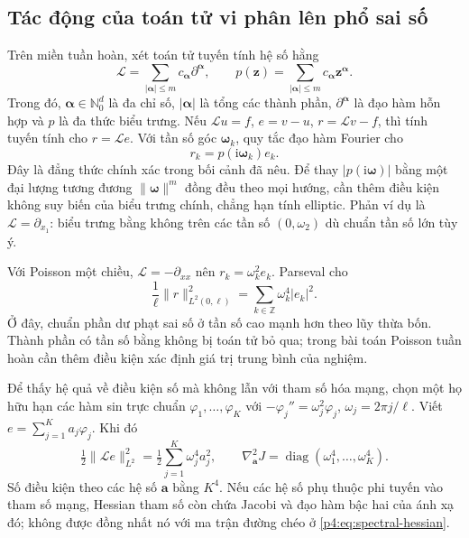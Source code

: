 \subsection{Tác động của toán tử vi phân lên phổ sai số}

Trên miền tuần hoàn, xét toán tử tuyến tính hệ số hằng
\begin{equation}
 \mathcal{L}=\sum_{|\boldsymbol{\alpha}|\leq m}
       c_{\boldsymbol{\alpha}}\partial^{\boldsymbol{\alpha}},
 \qquad
 p(\mathbf{z})=\sum_{|\boldsymbol{\alpha}|\leq m}
       c_{\boldsymbol{\alpha}}\mathbf{z}^{\boldsymbol{\alpha}}.
 \label{p4:eq:symbol}
\end{equation}
Trong đó, $\boldsymbol{\alpha}\in\mathbb{N}_0^d$ là đa chỉ số,
$|\boldsymbol{\alpha}|$ là tổng các thành phần,
$\partial^{\boldsymbol{\alpha}}$ là đạo hàm hỗn hợp và $p$ là đa thức
biểu trưng. Nếu $\mathcal{L}u=f$, $e=v-u$, $r=\mathcal{L}v-f$,
thì tính tuyến tính cho $r=\mathcal{L}e$. Với tần số góc
$\boldsymbol{\omega}_k$, quy tắc đạo hàm Fourier cho
\begin{equation}
 r_k=p(\mathrm{i}\boldsymbol{\omega}_k)e_k.
 \label{p4:eq:residual-symbol}
\end{equation}
Đây là đẳng thức chính xác trong bối cảnh đã nêu. Để thay
$|p(\mathrm{i}\boldsymbol{\omega})|$ bằng một đại lượng tương đương
$\|\boldsymbol{\omega}\|^m$ đồng đều theo mọi hướng, cần thêm điều
kiện không suy biến của biểu trưng chính, chẳng hạn tính elliptic.
Phản ví dụ là $\mathcal{L}=\partial_{x_1}$: biểu trưng bằng không
trên các tần số $(0,\omega_2)$ dù chuẩn tần số lớn tùy ý.

Với Poisson một chiều, $\mathcal{L}=-\partial_{xx}$ nên
$r_k=\omega_k^2e_k$. Parseval cho
\begin{equation}
 \frac{1}{\ell}\|r\|_{L^2(0,\ell)}^2
 =\sum_{k\in\mathbb{Z}}\omega_k^4|e_k|^2.
 \label{p4:eq:poisson-spectral-loss}
\end{equation}
Ở đây, chuẩn phần dư phạt sai số ở tần số cao mạnh hơn theo lũy thừa
bốn. Thành phần có tần số bằng không bị toán tử bỏ qua; trong bài toán Poisson tuần hoàn
cần thêm điều kiện xác định giá trị trung bình của nghiệm.

Để thấy hệ quả về điều kiện số mà không lẫn với tham số hóa mạng,
chọn một họ hữu hạn các hàm sin trực chuẩn $\varphi_1,\ldots,\varphi_K$
với $-\varphi_j''=\omega_j^2\varphi_j$, $\omega_j=2\pi j/\ell$.
Viết $e=\sum_{j=1}^{K}a_j\varphi_j$. Khi đó
\begin{equation}
 \tfrac12\|\mathcal{L}e\|_{L^2}^2
 =\tfrac12\sum_{j=1}^{K}\omega_j^4a_j^2,
 \qquad
 \nabla_{\mathbf{a}}^2J=\operatorname{diag}(\omega_1^4,\ldots,\omega_K^4).
 \label{p4:eq:spectral-hessian}
\end{equation}
Số điều kiện theo các hệ số $\mathbf{a}$ bằng $K^4$.
Nếu các hệ số phụ thuộc phi tuyến vào tham số mạng, Hessian tham số
còn chứa Jacobi và đạo hàm bậc hai của ánh xạ đó; không được đồng
nhất nó với ma trận đường chéo ở \eqref{p4:eq:spectral-hessian}.

